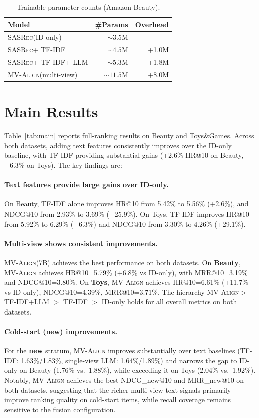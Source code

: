 \documentclass[sigconf,natbib=true,anonymous]{acmart}
\newcommand{\model}{\textsc{MV-Align}\xspace}
\newcommand{\base}{\textsc{SASRec}\xspace}
\newcommand{\tfidf}{\textsc{TF-IDF}\xspace}
\newcommand{\llm}{\textsc{LLM}\xspace}
\begin{document}
\begin{table}[h]
\caption{Trainable parameter counts (Amazon Beauty).}
\label{tab:params}
\centering
\small
\begin{tabular}{lrr}
\toprule
\textbf{Model} & \textbf{\#Params} & \textbf{Overhead} \\
\midrule
\base (ID-only) & ${\sim}3.5$M & --- \\
\base + \tfidf & ${\sim}4.5$M & +1.0M \\
\base + \tfidf + \llm & ${\sim}5.3$M & +1.8M \\
\model (multi-view) & ${\sim}11.5$M & +8.0M \\
\bottomrule
\end{tabular}
\end{table}

\section{Main Results}
Table~\ref{tab:main} reports full-ranking results on Beauty
and Toys\&Games. Across both datasets, adding text features
consistently improves over the ID-only baseline, with \tfidf
providing substantial gains (+2.6\% HR@10 on Beauty, +6.3\%
on Toys). The key findings are:

\paragraph{Text features provide large gains over ID-only.}
On Beauty, \tfidf alone improves HR@10 from 5.42\% to 5.56\%
(+2.6\%), and NDCG@10 from 2.93\% to 3.69\% (+25.9\%). On
Toys, \tfidf improves HR@10 from 5.92\% to 6.29\% (+6.3\%)
and NDCG@10 from 3.30\% to 4.26\% (+29.1\%).


\paragraph{Multi-view shows consistent improvements.}
\model (7B) achieves the best performance on both datasets.
On \textbf{Beauty}, \model achieves HR@10=5.79\% (+6.8\% vs
ID-only), with MRR@10=3.19\% and NDCG@10=3.80\%. On
\textbf{Toys}, \model achieves HR@10=6.61\% (+11.7\% vs
ID-only), NDCG@10=4.39\%, MRR@10=3.71\%. The hierarchy
\model $>$ TF-IDF+LLM $>$ TF-IDF $>$ ID-only holds for all
overall metrics on both datasets.

\paragraph{Cold-start (new) improvements.}
For the \textbf{new} stratum, \model improves substantially
over text baselines (\tfidf: 1.63\%/1.83\%, single-view \llm:
1.64\%/1.89\%) and narrows the gap to ID-only on Beauty
(1.76\% vs.\ 1.88\%), while exceeding it on Toys (2.04\%
vs.\ 1.92\%). Notably, \model achieves the best NDCG\_new@10
and MRR\_new@10 on both datasets, suggesting that the richer
multi-view text signals primarily improve ranking quality on
cold-start items, while recall coverage remains sensitive to
the fusion configuration.
\end{document}
